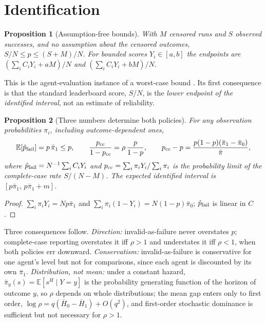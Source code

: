 \documentclass[11pt]{article}
\newtheorem{proposition}{Proposition}
\theoremstyle{definition}
\theoremstyle{remark}
\newcommand{\pb}{\bar\pi}
\newcommand{\E}{\mathbb{E}}
\begin{document}
\section{Identification}
\label{sec:ident}

\begin{proposition}[Assumption-free bounds]\label{prop:bounds}
With $M$ censored runs and $S$ observed successes, and no assumption about the
censored outcomes, $S/N\le p\le(S+M)/N$. For bounded scores $Y_i\in[a,b]$ the
endpoints are $(\sum_iC_iY_i+aM)/N$ and $(\sum_iC_iY_i+bM)/N$.
\end{proposition}

This is the agent-evaluation instance of a worst-case bound
\citep{manski1990nonparametric}. Its first consequence is that the standard
leaderboard score, $S/N$, is the \emph{lower endpoint of the identified
interval}, not an estimate of reliability.

\begin{proposition}[Three numbers determine both policies]\label{prop:three}
For any observation probabilities $\pi_i$, including outcome-dependent ones,
\[
\E[\hat p_{\rm fail}]=p\,\pb_1\le p,\qquad
\frac{p_{\rm cc}}{1-p_{\rm cc}}=\rho\,\frac{p}{1-p},\qquad
p_{\rm cc}-p=\frac{p(1-p)(\pb_1-\pb_0)}{\pb},
\]
where $\hat p_{\rm fail}=N^{-1}\sum_iC_iY_i$ and
$p_{\rm cc}=\sum_i\pi_iY_i/\sum_i\pi_i$ is the probability limit of the
complete-case rate $S/(N-M)$. The expected identified interval is
$[p\pb_1,\,p\pb_1+m]$.
\end{proposition}

\begin{proof}
$\sum_i\pi_iY_i=Np\pb_1$ and $\sum_i\pi_i(1-Y_i)=N(1-p)\pb_0$; $\hat p_{\rm fail}$
is linear in $C$.
\end{proof}

Three consequences follow. \emph{Direction:} invalid-as-failure never overstates
$p$; complete-case reporting overstates it iff $\rho>1$ and understates it iff
$\rho<1$, when both policies err downward. \emph{Conservatism:}
invalid-as-failure is conservative for one agent's level but not for
comparisons, since each agent is discounted by its own $\pb_1$.
\emph{Distribution, not mean:} under a constant hazard,
$\pb_y(s)=\E[s^H\mid Y=y]$ is the probability generating function of the horizon
of outcome $y$, so $\rho$ depends on whole distributions; the mean gap enters
only to first order, $\log\rho=q(\bar H_0-\bar H_1)+O(q^2)$, and first-order
stochastic dominance is sufficient but not necessary for $\rho>1$.
\end{document}
